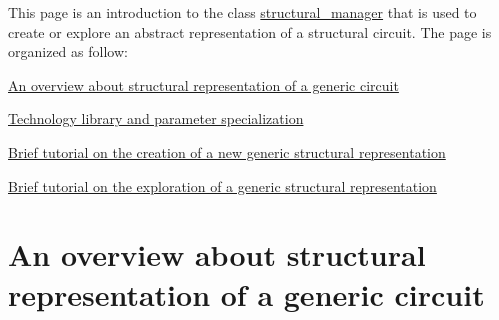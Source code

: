 This page is an introduction to the class \hyperlink{classstructural__manager}{structural\+\_\+manager} that is used to create or explore an abstract representation of a structural circuit. The page is organized as follow\+:
\begin{DoxyItemize}
\item \hyperlink{src_circuit_page_circuit_overview}{An overview about structural representation of a generic circuit}
\item \hyperlink{src_circuit_page_circuit_parameters}{Technology library and parameter specialization}
\item \hyperlink{src_circuit_page_circuit_creation_how_to}{Brief tutorial on the creation of a new generic structural representation}
\item \hyperlink{src_circuit_page_circuit_exploration_how_to}{Brief tutorial on the exploration of a generic structural representation}
\end{DoxyItemize}\hypertarget{src_circuit_page_circuit_overview}{}\section{An overview about structural representation of a generic circuit}\label{src_circuit_page_circuit_overview}
